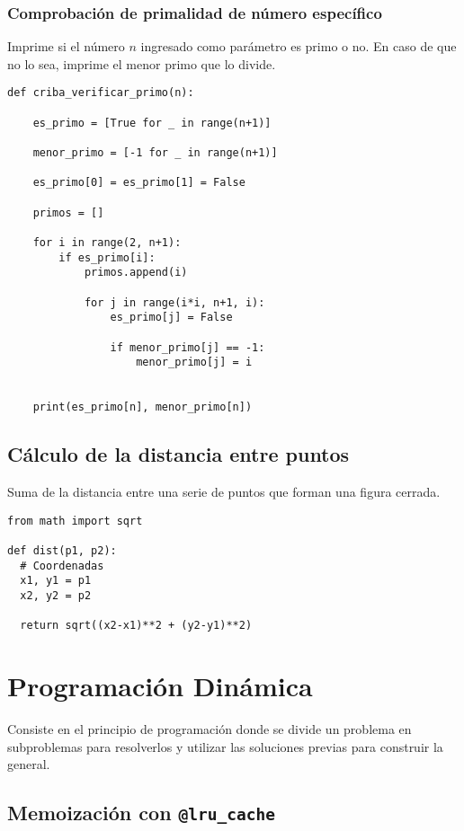 \documentclass[12pt,letterpaper]{article}
\begin{document}
\subsubsection{Comprobación de primalidad de número específico}

Imprime si el número $n$ ingresado como parámetro es primo o no.
En caso de que no lo sea, imprime el menor primo que lo divide.

\begin{verbatim}
def criba_verificar_primo(n):

    es_primo = [True for _ in range(n+1)]

    menor_primo = [-1 for _ in range(n+1)]

    es_primo[0] = es_primo[1] = False

    primos = []

    for i in range(2, n+1):
        if es_primo[i]:
            primos.append(i)

            for j in range(i*i, n+1, i):
                es_primo[j] = False

                if menor_primo[j] == -1:
                    menor_primo[j] = i


    print(es_primo[n], menor_primo[n])
\end{verbatim}

\subsection{Cálculo de la distancia entre puntos}

Suma de la distancia entre una serie de puntos que forman una figura cerrada.

\begin{verbatim}
from math import sqrt

def dist(p1, p2):
  # Coordenadas
  x1, y1 = p1
  x2, y2 = p2

  return sqrt((x2-x1)**2 + (y2-y1)**2)
\end{verbatim}

\section{Programación Dinámica}

Consiste en el principio de programación donde se divide un problema en subproblemas para resolverlos y utilizar las soluciones previas para construir la general.

\subsection{Memoización con \texttt{@lru\_cache}}
\end{document}

